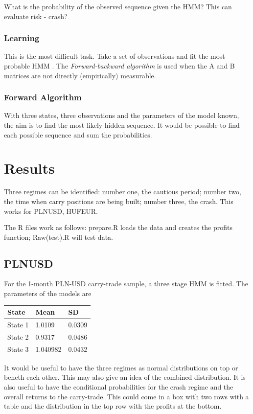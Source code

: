 \documentclass[12pt, a4paper, oneside]{article} %
\begin{document}
What is the probability of the observed sequence given the HMM? This can evaluate risk - crash? 

\subsubsection{Learning}
This is the most difficult task.  Take a set of observations and fit the most probable HMM . The \emph{Forward-backward algorithm} is used when the A and B matrices are not directly (empirically) measurable.  

\subsubsection{Forward Algorithm}
With three states, three observations and the parameters of the model known, the aim is to find the most likely hidden sequence.  It would be possible to find each possible sequence and sum the probabilities.  





\section{Results}
Three regimes can be identified: number one, the cautious period; number two, the time when carry positions are being built; number three, the crash.  This works for PLNUSD, HUFEUR. 

The R files work as follows: prepare.R loads the data and creates the profits function; Raw(test).R will test data. 

\subsection{PLNUSD}
For the 1-month PLN-USD carry-trade sample, a three stage HMM is fitted.  The parameters of the models are 

\begin{tabular}{l | l l}
State & Mean & SD \\
\hline
State 1 & 1.0109 & 0.0309\\
State 2 & 0.9317 & 0.0486\\
State 3 & 1.040982 & 0.0432\\
\end{tabular}

It would be useful to have the three regimes as normal distributions on top or beneth each other. This may also give an idea of the combined distribution.  It is also useful to have the conditional probabilities for the crash regime and the overall returns to the carry-trade.  This could come in a box with two rows with a table and the distribution in the top row with the profits at the bottom. 
\end{document}
